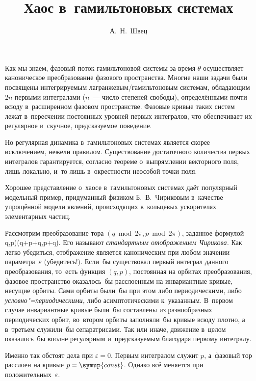 \documentclass[a4paper,11pt]{article}
\makeatletter
\def\[#1\]{\begin{align*}#1\end{align*}}
\theoremstyle{definition}
\newcommand\metasetup{\hypersetup{
	pdftitle=\@title,
	pdfauthor=\@author,
	linkbordercolor={0 .5 .25},
	}}
\makeatother
\begin{document}

\title{Хаос в~гамильтоновых системах}
\author{А.~Н.~Швец}

\metasetup
\maketitle

Как мы знаем, фазовый поток гамильтоновой системы за время $\theta$
осуществляет каноническое преобразование фазового пространства. Многие наши
задачи были посвящены интегрируемым лагранжевым/гамильтоновым системам,
обладающим $2n$ первыми интегралами ($n$~— число степеней свободы),
определёнными почти всюду в~расширенном фазовом пространстве. Фазовые кривые
таких систем лежат в~пересчении постоянных уровней первых интегралов, что
обеспечивает их регулярное и~скучное, предсказуемое поведение.

Но регулярная динамика в~гамильтоновых системах является скорее исключением,
нежели правилом. Существование достаточного количества первых интегралов
гарантируется, согласно теореме о~выпрямлении векторного поля, лишь локально,
и~то лишь в~окрестности неособой точки поля.

Хорошее представление о~хаосе в~гамильтоновых системах даёт популярный
модельный пример, придуманный физиком Б.~В.~Чириковым в~качестве упрощённой
модели явлений, происходящих в~кольцевых ускорителях элементарных частиц.

Рассмотрим преобразование тора $(q\bmod2\pi,p\bmod2\pi)$, заданное формулой
	\[
	(q,p)\mapsto(q+p+\varepsilon\sin q,p+\varepsilon\sin q).
	\]
Его называют \emph{стандартным отображением Чирикова.} Как легко убедиться,
отображение является каноническим при любом значении параметра~$\varepsilon$
(убедитесь!). Если~бы существовал первый интеграл данного преобразования,
то~есть функция $(q,p)$, постоянная на орбитах преобразования, фазовое
пространство оказалось~бы расслоенным на инвариантные кривые, несущие орбиты.
Сами орбиты были~бы при этом либо периодическими, либо
\emph{условно"=периодическими,} либо асимптотическими к~указанным. В~первом
случае инвариантные кривые были~бы составлены из разнообразных периодических
орбит, во~втором орбиты заполняли~бы кривые всюду плотно, а в~третьем
служили~бы сепаратрисами. Так или иначе, движение в~целом оказалось~бы вполне
регулярным и~предсказуемым благодаря первому интегралу.

Именно так обстоят дела при $\varepsilon=0$. Первым интегралом служит $p$,
а~фазовый тор расслоен на кривые $p=\symup{const}$. Однако всё меняется при
положительных~$\varepsilon$.
\end{document}
